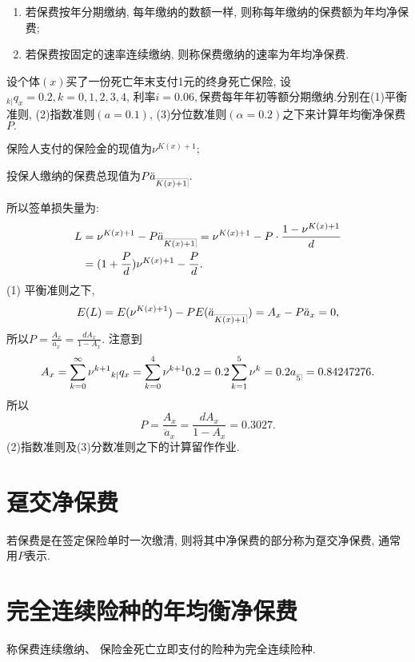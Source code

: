 \documentclass[lang=cn,10pt]{elegantbook}
\makeatletter
\DeclareRobustCommand{\annu}[1]{_{%
    \def\arraystretch{0}%
    \setlength\arraycolsep{1pt}%
    \setlength\arrayrulewidth{.2pt}%
    \begin{array}[b]{@{}c|}\hline
        \\[\arraycolsep]%
        \scriptstyle #1%
    \end{array}%
}}
\makeatother
\begin{document}
\begin{definition}[年均衡净保费]
    \begin{enumerate}
        \item 若保费按年分期缴纳, 每年缴纳的数额一样, 则称每年缴纳的保费额为年均净保费;
        \item 若保费按固定的速率连续缴纳, 则称保费缴纳的速率为年均净保费.
    \end{enumerate}
\end{definition}

\begin{example}\label{e4.1}
    设个体$(x)$买了一份死亡年末支付1元的终身死亡保险, 设$_{k| }q_x=0.2,k=0,1,2,3,4$, 利率$i=0.06,$保费每年年初等额分期缴纳.分别在(1)平衡准则, (2)指数准则$(a=0.1)$, (3)分位数准则$(\alpha=0.2)$之下来计算年均衡净保费$P.$
\end{example}
\begin{solution}
    保险人支付的保险金的现值为$\nu^{K(x)+1};$

    投保人缴纳的保费总现值为$P\ddot a_{\annu {K(x)+1}}.$

    所以签单损失量为:
    \begin{align*}
        L & =\nu^{K(x)+1}-P\ddot a_{\annu {K(x)+1}}=\nu^{K(x)+1}-P\cdot\frac{1-\nu^{K(x)+1}}{d} \\
          & =(1+\frac{P}{d})\nu^{K(x)+1}-\frac{P}{d}.                                           \\
    \end{align*}
    (1) 平衡准则之下,
    $$E(L)=E(\nu^{K(x)+1})-PE(\ddot a_{\annu {K(x)+1}})=A_x-P\ddot a_{x}=0,$$
    所以$P=\frac{A_x}{\ddot a_{x}}=\frac{dA_x}{1-A_x}.$
    注意到$$
        A_x  =\sum_{k=0}^{\infty }{\nu^{k+1}{}_{k|}q_x}=\sum_{k=0}^4{\nu^{k+1}0.2}=0.2\sum_{k=1}^{5}{\nu^k}=0.2a_{\annu 5}=0.84247276.
    $$
    所以$$P=\frac{A_x}{\ddot a_{x}}=\frac{dA_x}{1-A_x}=0.3027.$$
    (2)指数准则及(3)分数准则之下的计算留作作业.
\end{solution}

\section{趸交净保费}
\begin{definition}[趸交净保费]
    若保费是在签定保险单时一次缴清, 则将其中净保费的部分称为趸交净保费, 通常用$P$表示.
\end{definition}

\section{完全连续险种的年均衡净保费}
\begin{definition}
    称保费连续缴纳、 保险金死亡立即支付的险种为完全连续险种.
\end{definition}
\end{document}
